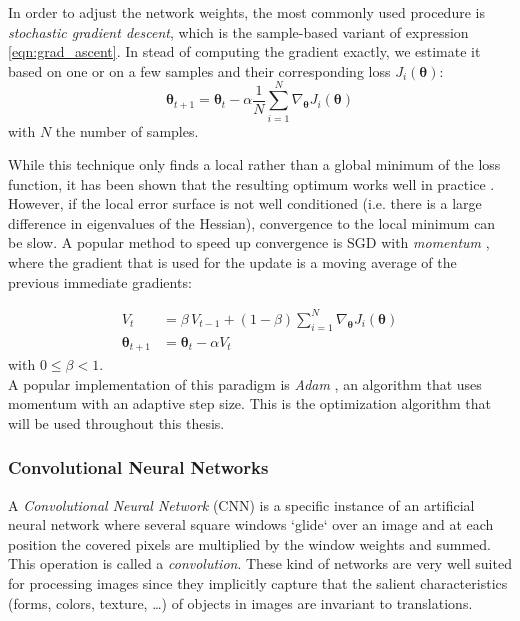 In order to adjust the network weights, the most commonly used procedure is \emph{stochastic gradient descent}, which is the sample-based variant of expression \ref{eqn:grad_ascent}. In stead of computing the gradient exactly, we estimate it based on one or on a few samples and their corresponding loss $J_{i}(\bm{\theta})$: 
\begin{equation}
    \label{eqn:sgd}
    \bm{\theta}_{t+1} = \bm{\theta}_{t} - \alpha \frac{1}{N} \sum_{i=1}^{N} \nabla_{\bm{\theta}} J_{i}(\bm{\theta})
\end{equation}
with $N$ the number of samples.

While this technique only finds a local rather than a global minimum of the loss function, it has been shown that the resulting optimum works well in practice \cite{bottou2010large}.  However, if the local error surface is not well conditioned (i.e. there is a large difference in eigenvalues of the Hessian), convergence to the local minimum can be slow. A popular method to speed up convergence is SGD with \emph{momentum} \cite{qian1999momentum}, where the gradient that is used for the update is a moving average of the previous immediate gradients:

\begin{align*}
        V_t &= \beta \, V_{t-1} + (1-\beta) \sum_{i=1}^{N} \nabla_{\bm{\theta}} J_{i}(\bm{\theta})\\
        \bm{\theta}_{t+1} &= \bm{\theta}_{t} - \alpha V_t
\end{align*}
with $0 \leq \beta < 1$.\\
A popular implementation of this paradigm is \emph{Adam} \cite{kingma2014adam}, an algorithm that uses momentum with an adaptive step size. This is the optimization algorithm that will be used throughout this thesis.

\subsubsection{Convolutional Neural Networks}
A \emph{Convolutional Neural Network} (CNN) \cite{lecun1989backpropagation} is a specific instance of an artificial neural network where several square windows `glide` over an image and at each position the covered pixels are multiplied by the window weights and summed. This operation is called a \emph{convolution}. These kind of networks are very well suited for processing images since they implicitly capture that the salient characteristics (forms, colors, texture, \ldots) of objects in images are invariant to translations.\\

